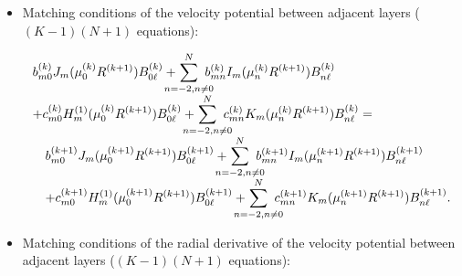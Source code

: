 \documentclass{jfm}
\begin{document}
\begin{itemize}
  \item 
Matching conditions of the velocity potential between adjacent layers ($(K-1)(N+1)$ equations):

\begin{eqnarray}
\begin{array}{l}
\displaystyle b_{m0}^{(k)}J_m(\mu^{(k)}_0 R^{(k+1)})B_{0\ell}^{(k)}+ \hspace{-4mm} \sum_{n=-2,n\ne 0}^{N}\hspace{-3mm} b^{(k)}_{mn} I_m(\mu^{(k)}_n R^{(k+1)}) B_{n\ell}^{(k)} \\
\displaystyle +c_{m0}^{(k)}H_m^{(1)}(\mu^{(k)}_0 R^{(k+1)})B_{0\ell}^{(k)} +\hspace{-4mm} \sum_{n=-2,n\ne 0}^{N}\hspace{-3mm} c^{(k)}_{mn} K_m(\mu^{(k)}_n R^{(k+1)}) B_{n\ell}^{(k)}=\\
\displaystyle \quad b_{m0}^{(k+1)}J_m(\mu^{(k+1)}_0 R^{(k+1)})B_{0\ell}^{(k+1)}+ \hspace{-4mm} \sum_{n=-2,n\ne 0}^{N}\hspace{-3mm} b^{(k+1)}_{mn} I_m(\mu^{(k+1)}_n R^{(k+1)}) B_{n\ell}^{(k+1)} \\
\displaystyle \quad +c_{m0}^{(k+1)}H_m^{(1)}(\mu^{(k+1)}_0 R^{(k+1)})B_{0\ell}^{(k+1)} +\hspace{-4mm} \sum_{n=-2,n\ne 0}^{N}\hspace{-3mm} c^{(k+1)}_{mn} K_m(\mu^{(k+1)}_n R^{(k+1)}) B_{n\ell}^{(k+1)}.
\end{array}
\end{eqnarray}

  \item 
Matching conditions of the radial derivative of the velocity potential between adjacent layers ($(K-1)(N+1)$ equations):


\end{itemize}
\end{document}
